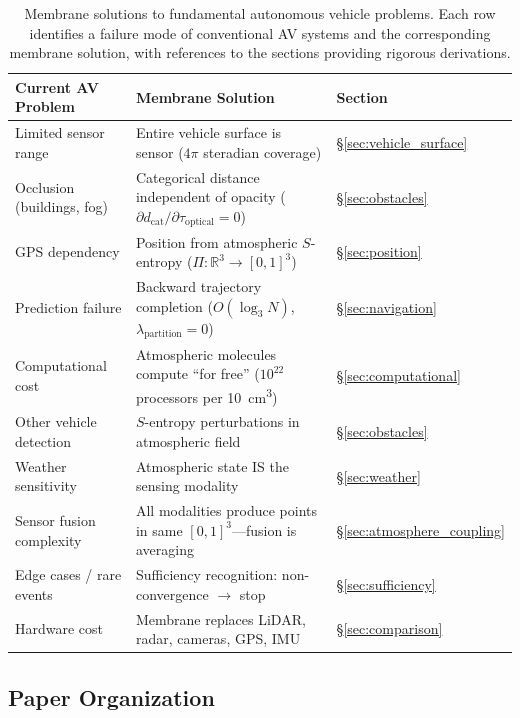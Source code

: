 \documentclass[twocolumn,10pt]{article}
\theoremstyle{definition}
\theoremstyle{remark}
\newcommand{\dcat}{d_{\mathrm{cat}}}
\begin{document}
\begin{table}[H]
\centering
\caption{Membrane solutions to fundamental autonomous vehicle problems. Each row identifies a failure mode of conventional AV systems and the corresponding membrane solution, with references to the sections providing rigorous derivations.}
\label{tab:av_problems}
\small
\begin{tabularx}{\textwidth}{@{}p{3.5cm}p{4.5cm}X@{}}
\toprule
\textbf{Current AV Problem} & \textbf{Membrane Solution} & \textbf{Section} \\
\midrule
Limited sensor range & Entire vehicle surface is sensor ($4\pi$ steradian coverage) & \S\ref{sec:vehicle_surface} \\
Occlusion (buildings, fog) & Categorical distance independent of opacity ($\partial \dcat/\partial\tau_{\mathrm{optical}} = 0$) & \S\ref{sec:obstacles} \\
GPS dependency & Position from atmospheric $S$-entropy ($\Pi: \mathbb{R}^3 \to [0,1]^3$) & \S\ref{sec:position} \\
Prediction failure & Backward trajectory completion ($O(\log_3 N)$, $\lambda_{\mathrm{partition}} = 0$) & \S\ref{sec:navigation} \\
Computational cost & Atmospheric molecules compute ``for free'' ($10^{22}$ processors per \SI{10}{cm^3}) & \S\ref{sec:computational} \\
Other vehicle detection & $S$-entropy perturbations in atmospheric field & \S\ref{sec:obstacles} \\
Weather sensitivity & Atmospheric state IS the sensing modality & \S\ref{sec:weather} \\
Sensor fusion complexity & All modalities produce points in same $[0,1]^3$---fusion is averaging & \S\ref{sec:atmosphere_coupling} \\
Edge cases / rare events & Sufficiency recognition: non-convergence $\to$ stop & \S\ref{sec:sufficiency} \\
Hardware cost & Membrane replaces LiDAR, radar, cameras, GPS, IMU & \S\ref{sec:comparison} \\
\bottomrule
\end{tabularx}
\end{table}

\subsection{Paper Organization}
\end{document}
